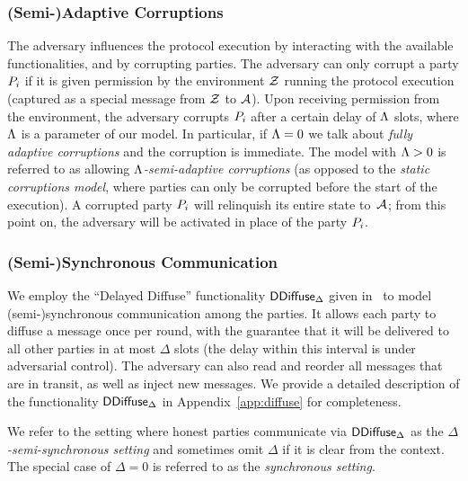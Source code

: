 \subsubsection{(Semi-)Adaptive Corruptions}
\label{sec:prelim-corr}

The adversary  influences the protocol execution by interacting
with the available functionalities, and by corrupting parties.
The adversary can only corrupt a party $P_i$ if it is given
permission by the environment $\mathcal{Z}$ running the protocol execution (captured as
a special message from $\mathcal{Z}$ to $\mathcal{A}$).
Upon receiving permission from the environment, the adversary
corrupts $P_i$ after a certain delay of $\Lambda$ slots, where $\Lambda$ is
a parameter of our model. In particular, if $\Lambda=0$ we talk about
\emph{fully adaptive corruptions} and the corruption is immediate.
The model with $\Lambda>0$ is
referred to as allowing \emph{$\Lambda$-semi-adaptive corruptions} (as opposed to the
\emph{static corruptions model}, where parties can only be corrupted before the
start of the execution).
%
A corrupted
party $P_i$ will relinquish its entire state to~$\mathcal{A}$;
from this point on, the adversary will be activated in place of the
party $P_i$.

\subsubsection{(Semi-)Synchronous Communication}
\label{sec:prelim-comm}


We employ the ``Delayed Diffuse'' functionality $\mathsf{DDiffuse}_\Delta$ given in~\cite{EC:DGKR18} to
model (semi-)synchronous communication among the parties. It allows each party
to diffuse a message once per round, with the guarantee that it will be
delivered to all other parties in at most $\Delta$ slots (the delay within this
interval is under adversarial control). The adversary can also read and reorder
all messages that are in transit, as well as inject new messages.
We provide a detailed description of the functionality $\mathsf{DDiffuse}_\Delta$ in
Appendix~\ref{app:diffuse} for completeness.

We refer to the setting where honest parties communicate via $\mathsf{DDiffuse}_\Delta$
as the \emph{$\Delta$-semi-synchronous setting} and sometimes omit $\Delta$ if
it is clear from the context. The special case of $\Delta=0$ is referred to as
the \emph{synchronous setting}.

